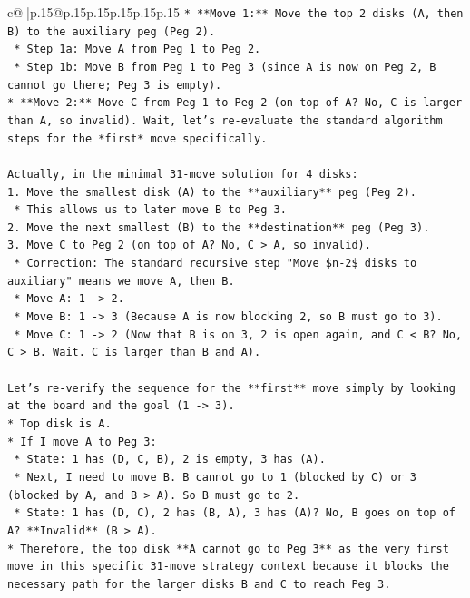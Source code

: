 \documentclass{article}
\begin{document}
{\begin{supertabular}{c@{$\;$}|p{.15\linewidth}@{}p{.15\linewidth}p{.15\linewidth}p{.15\linewidth}p{.15\linewidth}p{.15\linewidth}}
{{{\texttt{*   **Move 1:** Move the top 2 disks (A, then B) to the auxiliary peg (Peg 2).} \\
\texttt{    *   Step 1a: Move A from Peg 1 to Peg 2.} \\
\texttt{    *   Step 1b: Move B from Peg 1 to Peg 3 (since A is now on Peg 2, B cannot go there; Peg 3 is empty).} \\
\texttt{*   **Move 2:** Move C from Peg 1 to Peg 2 (on top of A? No, C is larger than A, so invalid). Wait, let's re{-}evaluate the standard algorithm steps for the *first* move specifically.} \\
\\ 
\texttt{Actually, in the minimal 31{-}move solution for 4 disks:} \\
\texttt{1.  Move the smallest disk (A) to the **auxiliary** peg (Peg 2).} \\
\texttt{    *   This allows us to later move B to Peg 3.} \\
\texttt{2.  Move the next smallest (B) to the **destination** peg (Peg 3).} \\
\texttt{3.  Move C to Peg 2 (on top of A? No, C > A, so invalid).} \\
\texttt{    *   Correction: The standard recursive step "Move \$n{-}2\$ disks to auxiliary" means we move A, then B.} \\
\texttt{    *   Move A: 1 {-}> 2.} \\
\texttt{    *   Move B: 1 {-}> 3 (Because A is now blocking 2, so B must go to 3).} \\
\texttt{    *   Move C: 1 {-}> 2 (Now that B is on 3, 2 is open again, and C < B? No, C > B. Wait. C is larger than B and A).} \\
\\ 
\texttt{Let's re{-}verify the sequence for the **first** move simply by looking at the board and the goal (1 {-}> 3).} \\
\texttt{*   Top disk is A.} \\
\texttt{*   If I move A to Peg 3:} \\
\texttt{    *   State: 1 has (D, C, B), 2 is empty, 3 has (A).} \\
\texttt{    *   Next, I need to move B. B cannot go to 1 (blocked by C) or 3 (blocked by A, and B > A). So B must go to 2.} \\
\texttt{    *   State: 1 has (D, C), 2 has (B, A), 3 has (A)? No, B goes on top of A? **Invalid** (B > A).} \\
\texttt{*   Therefore, the top disk **A cannot go to Peg 3** as the very first move in this specific 31{-}move strategy context because it blocks the necessary path for the larger disks B and C to reach Peg 3.} \\
}}}
\end{supertabular}}
\end{document}
